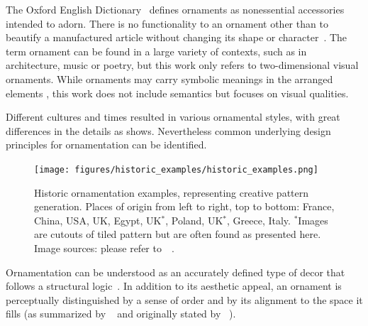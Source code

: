 

The Oxford English Dictionary~\cite{oed_2017} defines ornaments as nonessential accessories intended to adorn. There is no functionality to an ornament other than to beautify a manufactured article without changing its shape or character~\cite{ward_1896_tpo}. The term ornament can be found in a large variety of contexts, such as in architecture, music or poetry, but this work only refers to two-dimensional visual ornaments. While ornaments may carry symbolic meanings in the arranged elements \cite{wornum_1896_aof}, this work does not include semantics but focuses on visual qualities.  

Different cultures and times resulted in various ornamental styles, with great differences in the details as  shows. Nevertheless common underlying design principles for ornamentation can be identified.

\begin{figure}
       \texttt{[image: figures/historic\_examples/historic\_examples.png]}
        \caption[Historic pattern examples]{\label{fig:historic_examples} Historic ornamentation examples, representing creative pattern generation. Places of origin from left to right, top to bottom:  France, China, USA, UK, Egypt, UK$^{*}$, Poland, UK$^{*}$, Greece, Italy. $^{*}$Images are cutouts of tiled pattern but are often found as presented here. Image sources: please refer to~~.}
\end{figure}

Ornamentation can be understood as an accurately defined type of decor that follows a structural logic~\cite{ward_1896_tpo, moughtin_1999_udo, arbruzzo_2006_dec}. 
In addition to its aesthetic appeal, an ornament is perceptually distinguished by a sense of order and by its alignment to the space it fills (as summarized by \citeauthor*{wong_1998_cgf}~\cite{wong_1998_cgf} and originally stated by \citeauthor*{ward_1896_tpo}~\cite{ward_1896_tpo, dresser_1875_pdd, arbruzzo_2006_dec}). 


